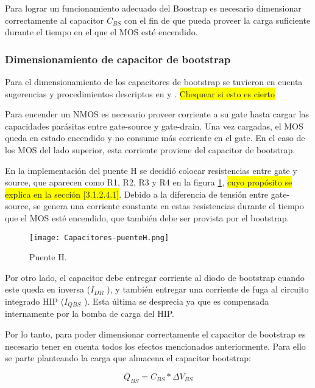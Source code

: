 \noindent Para lograr un funcionamiento adecuado del Boostrap es necesario dimensionar correctamente al capacitor $C_{BS}$ con el fin de que pueda proveer la carga suficiente durante el tiempo en el que el MOS esté encendido.


\subsubsection{Dimensionamiento de capacitor de bootstrap}

\noindent Para el dimensionamiento de los capacitores de bootstrap se tuvieron en cuenta sugerencias y procedimientos descriptos en \cite{HIP4081A_AN9405} y \cite{HIP4081A_FN3659}.
\colorbox{yellow}{Chequear si esto es cierto}	

\noindent Para encender un NMOS es necesario proveer corriente a su gate hasta cargar las capacidades parásitas entre gate-source y gate-drain. Una vez cargadas, el MOS queda en estado encendido y no consume más corriente en el gate. En el caso de los MOS del lado superior, esta corriente proviene del capacitor de bootstrap. 

\noindent En la implementación del puente H se decidió colocar resistencias entre gate y source, que aparecen como R1, R2, R3 y R4 en la figura \ref{fig:img_capacitores-puenteH}, \colorbox{yellow}{cuyo propósito se explica en la sección [3.1.2.4.1]}. Debido a la diferencia de tensión entre gate-source, se genera una corriente constante en estas resistencias durante el tiempo que el MOS esté encendido, que también debe ser provista por el  bootstrap.

\begin{figure}[H]
	\centering
	\texttt{[image: Capacitores-puenteH.png]}
	\caption{Puente H.}
	\label{fig:img_capacitores-puenteH}
\end{figure}

\noindent Por otro lado, el capacitor debe entregar corriente al diodo de bootstrap cuando este queda en inversa ($I_{DR}$ ), y también entregar una corriente de fuga al circuito integrado HIP ($I_{QBS}$ ). Esta última se desprecia ya que es compensada internamente por la bomba de carga del HIP.

\noindent Por lo tanto, para poder dimensionar correctamente el capacitor de bootstrap es necesario tener en cuenta todos los efectos mencionados anteriormente. Para ello se parte planteando la carga que almacena el capacitor bootstrap:

\begin{equation} \label{eq_carga-cap-bootstrap}
Q_{BS}=C_{BS}*\Delta V_{BS}
\end{equation}

